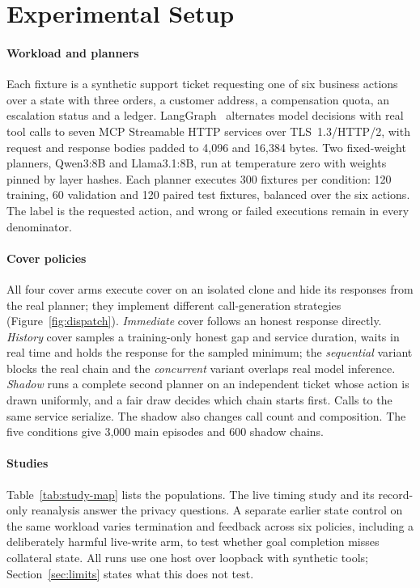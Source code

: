 \section{Experimental Setup}\label{sec:setup}
\paragraph{Workload and planners}
Each fixture is a synthetic support ticket requesting one of six business actions over a state with three orders, a customer address, a compensation quota, an escalation status and a ledger. LangGraph~\cite{langchain2025langgraph} alternates model decisions with real tool calls to seven MCP Streamable HTTP services over TLS~1.3/HTTP/2, with request and response bodies padded to 4,096 and 16,384 bytes. Two fixed-weight planners, Qwen3:8B and Llama3.1:8B, run at temperature zero with weights pinned by layer hashes. Each planner executes 300 fixtures per condition: 120 training, 60 validation and 120 paired test fixtures, balanced over the six actions. The label is the requested action, and wrong or failed executions remain in every denominator.

\paragraph{Cover policies}
All four cover arms execute cover on an isolated clone and hide its responses from the real planner; they implement different call-generation strategies (Figure~\ref{fig:dispatch}). \emph{Immediate} cover follows an honest response directly. \emph{History} cover samples a training-only honest gap and service duration, waits in real time and holds the response for the sampled minimum; the \emph{sequential} variant blocks the real chain and the \emph{concurrent} variant overlaps real model inference. \emph{Shadow} runs a complete second planner on an independent ticket whose action is drawn uniformly, and a fair draw decides which chain starts first. Calls to the same service serialize. The shadow also changes call count and composition. The five conditions give 3,000 main episodes and 600 shadow chains.




\paragraph{Studies}
Table~\ref{tab:study-map} lists the populations. The live timing study and its record-only reanalysis answer the privacy questions. A separate earlier state control on the same workload varies termination and feedback across six policies, including a deliberately harmful live-write arm, to test whether goal completion misses collateral state. All runs use one host over loopback with synthetic tools; Section~\ref{sec:limits} states what this does not test.
